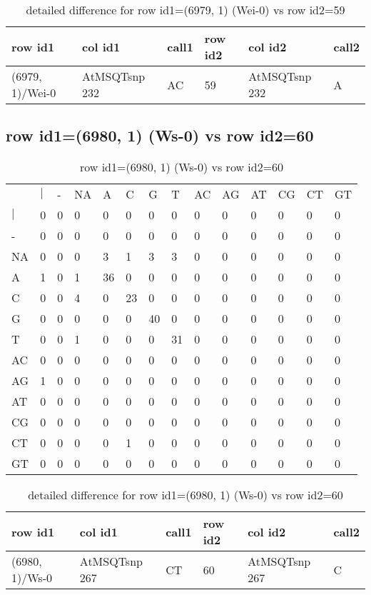 \begin{center}
\begin{longtable}{|l|l|l|l|l|l|}
\caption{detailed difference for row id1=(6979, 1) (Wei-0) vs row id2=59} \label{table_dm207}\\
\hline
row id1&col id1&call1&row id2&col id2&call2\\
\hline
(6979, 1)/Wei-0&AtMSQTsnp 232&AC&59&AtMSQTsnp 232&A\\
\hline
\end{longtable}
\end{center}

\subsection{row id1=(6980, 1) (Ws-0) vs row id2=60}
\begin{center}
\begin{longtable}{|l|l|l|l|l|l|l|l|l|l|l|l|l|l|}
\caption{row id1=(6980, 1) (Ws-0) vs row id2=60} \label{table_dm208}\\
\hline
\\
\hline
&$|$&-&NA&A&C&G&T&AC&AG&AT&CG&CT&GT\\
$|$&0&0&0&0&0&0&0&0&0&0&0&0&0\\
-&0&0&0&0&0&0&0&0&0&0&0&0&0\\
NA&0&0&0&3&1&3&3&0&0&0&0&0&0\\
A&1&0&1&36&0&0&0&0&0&0&0&0&0\\
C&0&0&4&0&23&0&0&0&0&0&0&0&0\\
G&0&0&0&0&0&40&0&0&0&0&0&0&0\\
T&0&0&1&0&0&0&31&0&0&0&0&0&0\\
AC&0&0&0&0&0&0&0&0&0&0&0&0&0\\
AG&1&0&0&0&0&0&0&0&0&0&0&0&0\\
AT&0&0&0&0&0&0&0&0&0&0&0&0&0\\
CG&0&0&0&0&0&0&0&0&0&0&0&0&0\\
CT&0&0&0&0&1&0&0&0&0&0&0&0&0\\
GT&0&0&0&0&0&0&0&0&0&0&0&0&0\\
\hline
\end{longtable}
\end{center}

\begin{center}
\begin{longtable}{|l|l|l|l|l|l|}
\caption{detailed difference for row id1=(6980, 1) (Ws-0) vs row id2=60} \label{table_dm209}\\
\hline
row id1&col id1&call1&row id2&col id2&call2\\
\hline
(6980, 1)/Ws-0&AtMSQTsnp 267&CT&60&AtMSQTsnp 267&C\\
\hline
\end{longtable}
\end{center}

